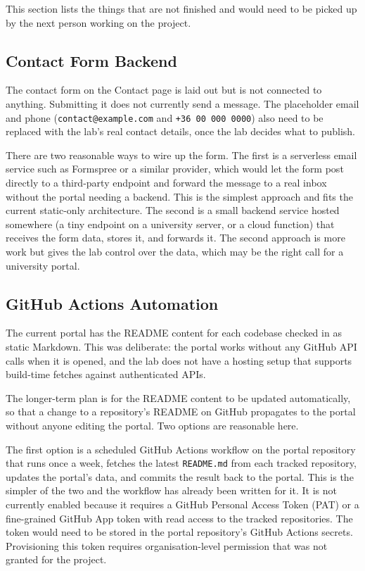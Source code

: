 This section lists the things that are not finished and would need to be picked up by the next person working on the project.

\subsection{Contact Form Backend}\label{subsec:challenges-contact}

The contact form on the Contact page is laid out but is not connected to anything. Submitting it does not currently send a message. The placeholder email and phone (\texttt{contact@example.com} and \texttt{+36 00 000 0000}) also need to be replaced with the lab's real contact details, once the lab decides what to publish.

There are two reasonable ways to wire up the form. The first is a serverless email service such as Formspree or a similar provider, which would let the form post directly to a third-party endpoint and forward the message to a real inbox without the portal needing a backend. This is the simplest approach and fits the current static-only architecture. The second is a small backend service hosted somewhere (a tiny endpoint on a university server, or a cloud function) that receives the form data, stores it, and forwards it. The second approach is more work but gives the lab control over the data, which may be the right call for a university portal.

\subsection{GitHub Actions Automation}\label{subsec:challenges-actions}

The current portal has the README content for each codebase checked in as static Markdown. This was deliberate: the portal works without any GitHub API calls when it is opened, and the lab does not have a hosting setup that supports build-time fetches against authenticated APIs.

The longer-term plan is for the README content to be updated automatically, so that a change to a repository's README on GitHub propagates to the portal without anyone editing the portal. Two options are reasonable here.

The first option is a scheduled GitHub Actions workflow on the portal repository that runs once a week, fetches the latest \texttt{README.md} from each tracked repository, updates the portal's data, and commits the result back to the portal. This is the simpler of the two and the workflow has already been written for it. It is not currently enabled because it requires a GitHub Personal Access Token (PAT) or a fine-grained GitHub App token with read access to the tracked repositories. The token would need to be stored in the portal repository's GitHub Actions secrets. Provisioning this token requires organisation-level permission that was not granted for the project.

